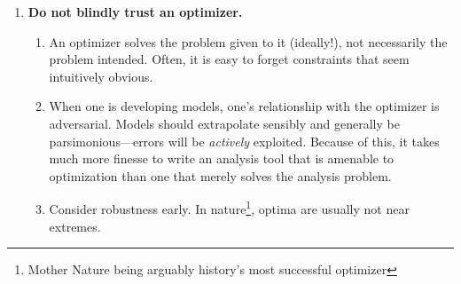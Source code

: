 \begin{enumerate}
\begin{enumerate}
        \item Analysis results used in MDO should be an \emph{unbiased} estimator of the author's belief state about some quantity. This is often \emph{not} the raw output of a first-principles physics model, since these often bias optimistic due to assumptions\footnote{As aerospace examples: a) a RANS CFD study on defeatured geometry that ignores flap track fairings, skin gaps, or protuberances; b) an XFoil analysis that assumes laminar flow beyond a line of leading-edge rivets; or c) a wing weight build-up that neglects expected weight growth during detailed design. These expected biases should be corrected, and these corrections \emph{do not count as margin}.}. A good rough litmus test for biased outputs is to consider whether one would be more surprised to learn that the model was erring high versus low—these should ideally carry roughly equal surprise.
        \item Account for margin explicitly, and usually only in top-level closure loops and parameters (weight, drag, power, load factor, etc.). Remember that margin is performance beyond the \emph{limit} case, not the \emph{baseline} case\footnote{For example, in aircraft design, thrust margin is the excess beyond what is needed for \emph{climb} (possibly with one engine inoperative), not \emph{cruise}. If performance is ever intended to be used during limit-case operation of the system, this cannot be counted as margin.}. Also, corrections for suspected bias do not count as margin: margin is for mitigating unknown unknowns, not known unknowns.
    \end{enumerate}
    \item \textbf{Do not blindly trust an optimizer.}
    \begin{enumerate}
        \item An optimizer solves the problem given to it (ideally!), not necessarily the problem intended. Often, it is easy to forget constraints that seem intuitively obvious.
        \item When one is developing models, one's relationship with the optimizer is adversarial. Models should extrapolate sensibly and generally be parsimonious—errors will be \emph{actively} exploited. Because of this, it takes much more finesse to write an analysis tool that is amenable to optimization than one that merely solves the analysis problem.
        \item Consider robustness early. In nature\footnote{Mother Nature being arguably history's most successful optimizer}, optima are usually not near extremes.

\end{enumerate}
\end{enumerate}
